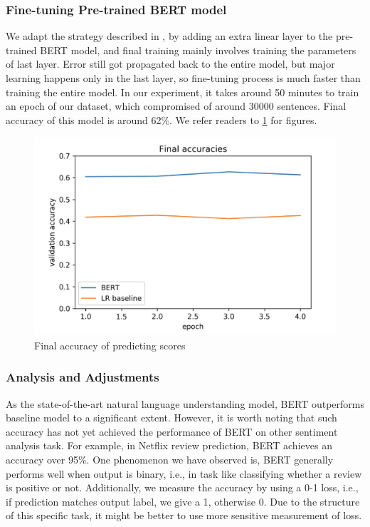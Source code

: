 \documentclass{article}
\begin{document}
\subsubsection{Fine-tuning Pre-trained BERT model}
We adapt the strategy described in \cite{2}, by adding an extra linear layer
to the pre-trained BERT model, and final training mainly involves training the
parameters of last layer. Error still got propagated back to the entire model,
but major learning happens only in the last layer, so fine-tuning process is
much faster than training the entire model. In our experiment, it takes around
50 minutes to train an epoch of our dataset, which compromised of around
30000 sentences. Final accuracy of this model is around 62\%. We refer 
readers to \ref{fig5} for figures.
\begin{figure}
\label{fig5}
\begin{center}
\includegraphics[scale=0.6]{final_acc}
\caption{Final accuracy of predicting scores}
\end{center}
\end{figure}

\subsubsection{Analysis and Adjustments}
As the state-of-the-art natural language understanding model, BERT 
outperforms baseline model to a significant extent. However, it is worth 
noting that such accuracy has not yet achieved the performance of BERT on
other sentiment analysis task. For example, in Netflix review prediction, 
BERT achieves an accuracy over 95\%. One phenomenon we have observed
is, BERT generally performs well when output is binary, i.e., in task like 
classifying whether a review is positive or not. Additionally, we measure the
accuracy by using a 0-1 loss, i.e., if prediction matches output label, we give
a 1, otherwise 0. Due to the structure of this specific task, it might be 
better to use more sensitive measurement of loss.
\end{document}
